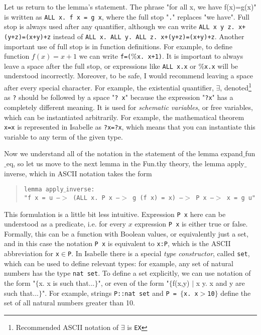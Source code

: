 \documentclass[11pt]{article}
\newcommand{\prog}[1]{\par\noindent\begin{quote}#1\end{quote}\par\noindent}
\begin{document}
Let us return to the lemma's statement. The phrase "for all x, we have f(x)=g(x)" is written as {\tt ALL x.~f x = g x}, where the full stop "{\tt .}" replaces "we have". Full stop is always used after any quantifier, although we can write {\tt ALL x y z.~x+(y+z)=(x+y)+z} instead of {\tt ALL x.~ALL y.~ALL z.~x+(y+z)=(x+y)+z}. Another important use of full stop is in function definitions. For example, to define function $f(x)=x+1$ we can write {\tt f=($\%$x.~x+1)}. It is important to always leave a space after the full stop, or expressions like {\tt ALL x.x} or {\tt $\%$x.x} will be understood incorrectly. Moreover, to be safe, I would recommend leaving a space after every special character. For example, the existential quantifier, $\exists$, denoted\footnote{Recommended ASCII notation of $\exists$ is {\tt EX}} as {\tt ?} should be followed by a space "{\tt ?~x}" because the expression "{\tt ?x}" has a completely different meaning. It is used for \emph{schematic variables}, or free variables, which can be instantiated arbitrarily. For example, the mathematical theorem {\tt x=x} is represented in Isabelle as {\tt ?x=?x}, which means that you can instantiate this variable to any term of the given type.

Now we understand all of the notation in the statement of the lemma expand$\_$fun$\_$eq, so let us move to the next lemma in the Fun.thy theory, the lemma apply$\_$inverse, which in ASCII notation takes the form

\prog{\tt lemma apply$\_$inverse: \\
    "f x = u --$>$ (ALL x. P x --$>$ g (f x) = x) --$>$ P x --$>$ x = g u"}%

This formulation is a little bit less intuitive.
Expression {\tt P x} here can be understood as a predicate, i.e. for every $x$ expression {\tt P x} is either true or false. Formally, this can be a function with Boolean values, or equivalently just a set, and in this case the notation {\tt P x} is equivalent to {\tt x:P}, which is the ASCII abbreviation for {\tt x$\in$P}. In Isabelle there is a special \emph{type constructor}, called {\tt set}, which can be used to define relevant types: for example, any set of natural numbers has the type {\tt nat set}. To define a set explicitly, we can use notation of the form "$\{$x. x is such that...$\}$", or even of the form "$\{$f(x,y) $|$ x y. x and y are such that...$\}$". For example, strings {\tt P::nat set} and {\tt P = $\{$x.~x$>$10$\}$} define the set of all natural numbers greater than 10.
\end{document}
